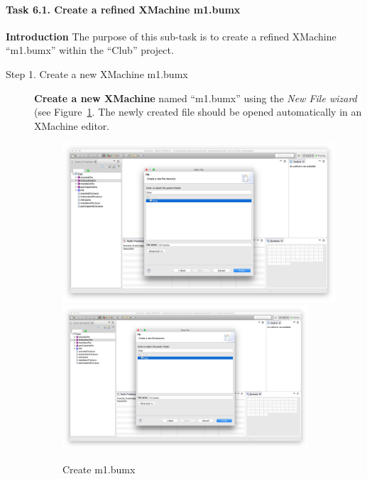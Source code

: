 \paragraph{Task 6.1. Create a refined XMachine m1.bumx}
\textbf{Introduction} The purpose of this sub-task is to create a refined XMachine ``m1.bumx'' within the ``Club'' project.
\begin{description}
\item[Step 1. Create a new XMachine m1.bumx] \textbf{Create a new XMachine} named ``m1.bumx'' using the \emph{New File wizard} (see Figure~\ref{fig:CreateM1}. The newly created file should be opened automatically in an XMachine editor.
  \begin{figure}[!htbp]
    \centering
    \ifplastex
    \includegraphics[width=512]{figures/CreateM1}
    \else
    \includegraphics[width=0.9\textwidth]{figures/CreateM1}
    \fi
    \caption{Create m1.bumx}
    \label{fig:CreateM1}
  \end{figure}


\end{description}
